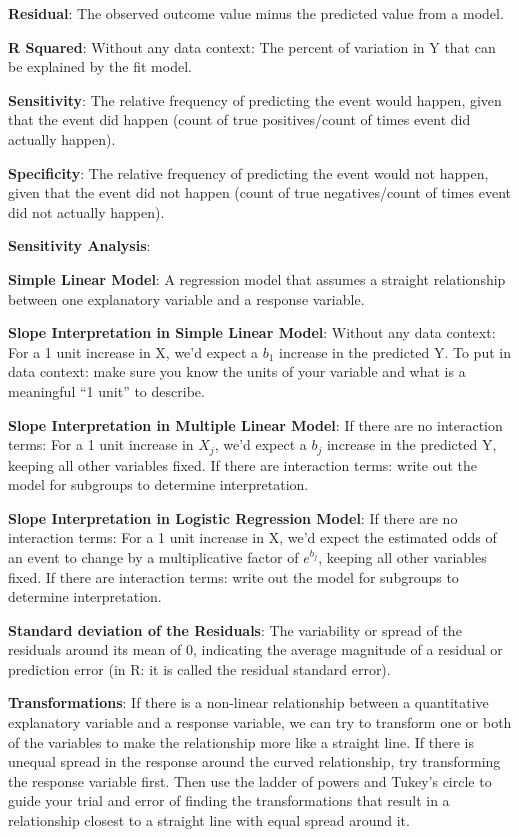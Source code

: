 \documentclass[]{book}
\begin{document}
\textbf{Residual}: The observed outcome value minus the predicted value from a model.

\textbf{R Squared}: Without any data context: The percent of variation in Y that can be explained by the fit model.

\textbf{Sensitivity}: The relative frequency of predicting the event would happen, given that the event did happen (count of true positives/count of times event did actually happen).

\textbf{Specificity}: The relative frequency of predicting the event would not happen, given that the event did not happen (count of true negatives/count of times event did not actually happen).

\textbf{Sensitivity Analysis}:

\textbf{Simple Linear Model}: A regression model that assumes a straight relationship between one explanatory variable and a response variable.

\textbf{Slope Interpretation in Simple Linear Model}: Without any data context: For a 1 unit increase in X, we'd expect a \(b_1\) increase in the predicted Y. To put in data context: make sure you know the units of your variable and what is a meaningful ``1 unit'' to describe.

\textbf{Slope Interpretation in Multiple Linear Model}: If there are no interaction terms: For a 1 unit increase in \(X_j\), we'd expect a \(b_j\) increase in the predicted Y, keeping all other variables fixed. If there are interaction terms: write out the model for subgroups to determine interpretation.

\textbf{Slope Interpretation in Logistic Regression Model}: If there are no interaction terms: For a 1 unit increase in X, we'd expect the estimated odds of an event to change by a multiplicative factor of \(e^{b_j}\), keeping all other variables fixed. If there are interaction terms: write out the model for subgroups to determine interpretation.

\textbf{Standard deviation of the Residuals}: The variability or spread of the residuals around its mean of 0, indicating the average magnitude of a residual or prediction error (in R: it is called the residual standard error).

\textbf{Transformations}: If there is a non-linear relationship between a quantitative explanatory variable and a response variable, we can try to transform one or both of the variables to make the relationship more like a straight line. If there is unequal spread in the response around the curved relationship, try transforming the response variable first. Then use the ladder of powers and Tukey's circle to guide your trial and error of finding the transformations that result in a relationship closest to a straight line with equal spread around it.
\end{document}
